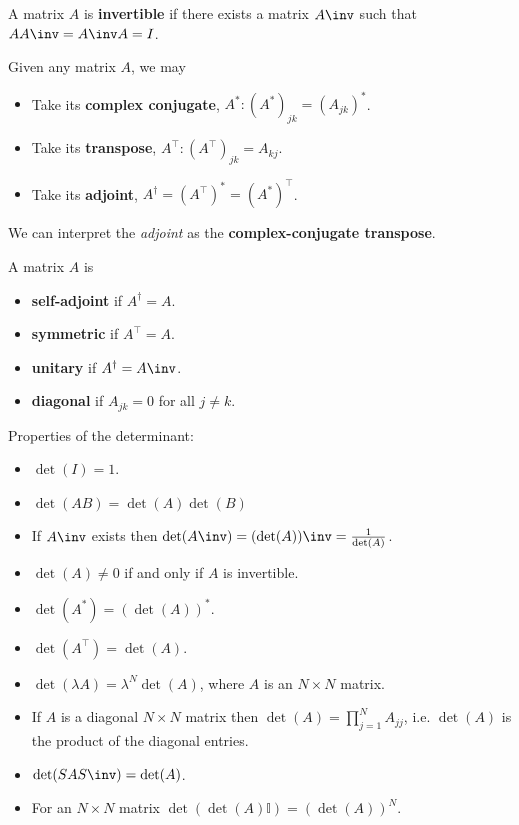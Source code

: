 \documentclass[12pt, a4paper]{article}
\begin{document}
\begin{definition}
    A matrix \(A\) is \textbf{invertible} if there exists a matrix \(A\inv\) such that \(AA\inv =A\inv A=I\).
\end{definition}

\begin{mdthm}
    Given any matrix \(A\), we may
    \begin{itemize}
        \item Take its \textbf{complex conjugate}, \(A^*: (A^*)_{jk}=(A_{jk})^*\).
        \item Take its \textbf{transpose}, \(A^{\top}:(A^{\top})_{jk}=A_{kj}\).
        \item Take its \textbf{adjoint}, \(A^{\dagger}=(A^{\top})^*=(A^*)^{\top}\).
    \end{itemize}
\end{mdthm}

\begin{mdnote}
    We can interpret the \textit{adjoint} as the \textbf{complex-conjugate transpose}.
\end{mdnote}

\begin{definition}
    A matrix \(A\) is
    \begin{itemize}
        \item \textbf{self-adjoint} if \(A^{\dagger}=A\).
        \item \textbf{symmetric} if \(A^{\top}=A\).
        \item \textbf{unitary} if \(A^{\dagger} =A\inv\).
        \item \textbf{diagonal} if \(A_{jk} =0\) for all \(j\neq k\).
    \end{itemize}
\end{definition}

\begin{mdthm}
    Properties of the determinant:
    \begin{itemize}
        \item \(\det(I)=1\).
        \item \(\det(AB)=\det(A)\det(B)\)
        \item If \(A\inv\) exists then \(\det(A\inv)=(\det(A))\inv = \frac{1}{\det(A)}\).
        \item \(\det(A)\neq 0\) if and only if \(A\) is invertible.
        \item \(\det(A^*)=(\det(A))^*\).
        \item \(\det(A^{\top})=\det(A)\).
        \item \(\det(\lambda A)=\lambda^N \det(A)\), where \(A\) is an \(N\times N\) matrix.
        \item If \(A\) is a diagonal \(N\times N\) matrix then \(\det(A)=\prod_{j=1}^N A_{jj}\), i.e. \(\det(A)\) is the product of the diagonal entries.
        \item \(\det(SAS\inv)=\det(A)\).
        \item For an \(N \times N\) matrix \(\det(\det(A)\mathbb{I})=(\det(A))^N\).
    \end{itemize}
\end{mdthm}
\end{document}
